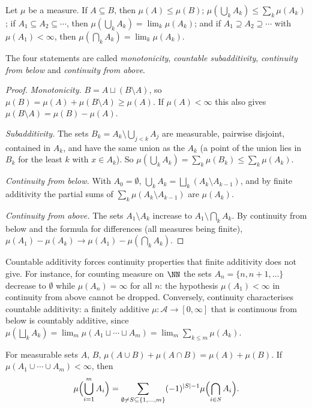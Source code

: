 \begin{proposition}\label{measure-theory:proposition-measure-properties}
Let $\mu$ be a measure. If $A \subseteq B$, then $\mu(A) \leq \mu(B)$; $\mu(\bigcup_kA_k) \leq \sum_k\mu(A_k)$; if $A_1 \subseteq A_2 \subseteq \cdots$, then $\mu(\bigcup_kA_k) = \lim_k\mu(A_k)$; and if
$A_1 \supseteq A_2 \supseteq \cdots$ with $\mu(A_1) < \infty$, then $\mu(\bigcap_kA_k) = \lim_k\mu(A_k)$.
\end{proposition}

The four statements are called \emph{monotonicity}, \emph{countable subadditivity}, \emph{continuity from below} and \emph{continuity from above}.

\begin{proof}
\emph{Monotonicity.} $B = A \sqcup (B \setminus A)$, so $\mu(B) = \mu(A) + \mu(B \setminus A) \geq \mu(A)$. If $\mu(A) < \infty$ this also gives $\mu(B \setminus A) = \mu(B) - \mu(A)$.

\emph{Subadditivity.} The sets $B_k = A_k \setminus \bigcup_{j<k}A_j$ are measurable, pairwise disjoint, contained in $A_k$, and have the same union as the $A_k$ (a point of the union lies in $B_k$ for
the least $k$ with $x \in A_k$). So $\mu(\bigcup_kA_k) = \sum_k\mu(B_k) \leq \sum_k\mu(A_k)$.

\emph{Continuity from below.} With $A_0 = \emptyset$, $\bigcup_kA_k = \bigsqcup_k(A_k \setminus A_{k-1})$, and by finite additivity the partial sums of $\sum_k\mu(A_k \setminus A_{k-1})$ are
$\mu(A_k)$.

\emph{Continuity from above.} The sets $A_1 \setminus A_k$ increase to $A_1 \setminus \bigcap_kA_k$. By continuity from below and the formula for differences (all measures being finite),
$\mu(A_1) - \mu(A_k) \to \mu(A_1) - \mu(\bigcap_kA_k)$.
\end{proof}

Countable additivity forces continuity properties that finite additivity does not give. For instance, for counting measure on $\NN$ the sets $A_n = \{n, n + 1, \ldots\}$ decrease to $\emptyset$ while
$\mu(A_n) = \infty$ for all $n$: the hypothesis $\mu(A_1) < \infty$ in continuity from above cannot be dropped. Conversely, continuity characterises countable additivity: a finitely additive
$\mu \colon \mathcal{A} \to [0, \infty]$ that is continuous from below is countably additive, since $\mu(\bigsqcup_kA_k) = \lim_m\mu(A_1 \sqcup \cdots \sqcup A_m) = \lim_m\sum_{k \leq m}\mu(A_k)$.

\begin{proposition}\label{measure-theory:proposition-inclusion-exclusion}
For measurable sets $A$, $B$, $\mu(A \cup B) + \mu(A \cap B) = \mu(A) + \mu(B)$. If $\mu(A_1 \cup \cdots \cup A_m) < \infty$, then
\[
\mu\Bigl(\bigcup_{i=1}^mA_i\Bigr) = \sum_{\emptyset \neq S \subseteq \{1, \ldots, m\}}(-1)^{|S| - 1}\mu\Bigl(\bigcap_{i \in S}A_i\Bigr).
\]
\end{proposition}

